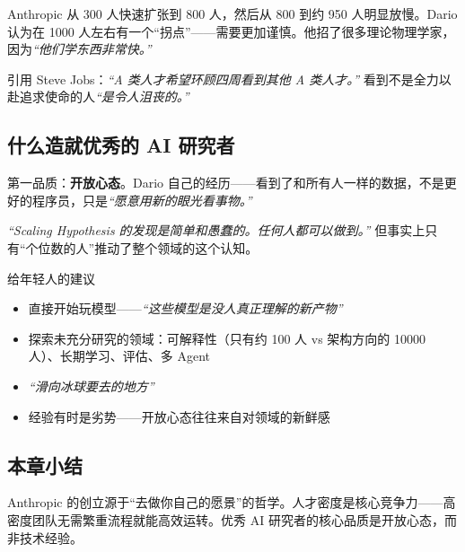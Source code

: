 Anthropic 从 300 人快速扩张到 800 人，然后从 800 到约 950 人明显放慢。Dario 认为在 1000 人左右有一个``拐点''——需要更加谨慎。他招了很多理论物理学家，因为\textit{``他们学东西非常快。''}

引用 Steve Jobs：\textit{``A 类人才希望环顾四周看到其他 A 类人才。''} 看到不是全力以赴追求使命的人\textit{``是令人沮丧的。''}

\subsection{什么造就优秀的 AI 研究者}

第一品质：\textbf{开放心态}。Dario 自己的经历——看到了和所有人一样的数据，不是更好的程序员，只是\textit{``愿意用新的眼光看事物。''}

\textit{``Scaling Hypothesis 的发现是简单和愚蠢的。任何人都可以做到。''} 但事实上只有``个位数的人''推动了整个领域的这个认知。

\begin{knowledgebox}{给年轻人的建议}
\begin{itemize}
    \item 直接开始玩模型——\textit{``这些模型是没人真正理解的新产物''}
    \item 探索未充分研究的领域：可解释性（只有约 100 人 vs 架构方向的 10000 人）、长期学习、评估、多 Agent
    \item \textit{``滑向冰球要去的地方''}
    \item 经验有时是劣势——开放心态往往来自对领域的新鲜感
\end{itemize}
\end{knowledgebox}

\subsection{本章小结}

Anthropic 的创立源于``去做你自己的愿景''的哲学。人才密度是核心竞争力——高密度团队无需繁重流程就能高效运转。优秀 AI 研究者的核心品质是开放心态，而非技术经验。

